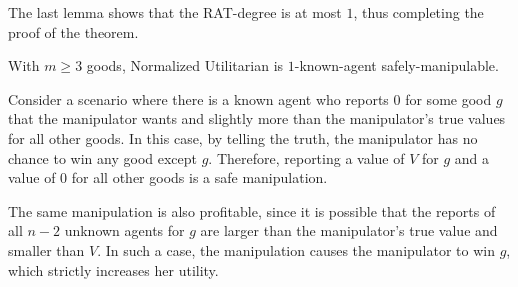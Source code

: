 \fi

The last lemma shows that the RAT-degree is at most $1$, thus completing the proof of the theorem.
\begin{lemmarep}\label{normalized-1-known}
    With $m \geq 3$ goods, Normalized Utilitarian is $1$-known-agent safely-manipulable.
\end{lemmarep}

\begin{proofsketch}
Consider a scenario where there is a known agent who reports $0$ for some good $g$ that the manipulator wants and slightly more than the manipulator’s true values for all other goods. In this case, by telling the truth, the manipulator has no chance to win any good except $g$. Therefore, reporting a 
value of $V$ for $g$ and a value of $0$ for all other goods is a safe manipulation.

The same manipulation is also profitable, since it is possible that the reports of all $n-2$ unknown agents for $g$ are larger than the manipulator’s true value and smaller than $V$. In such a case, the manipulation causes the manipulator to win $g$, which strictly increases her utility.
\end{proofsketch}


